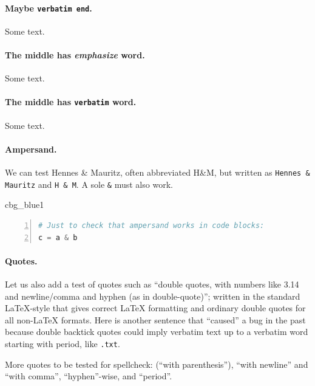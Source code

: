 \n\documentclass[%
oneside,                 %
final,                   %
10pt]{article}
\newenvironment{_cod_tight}[1]{
   \def\FrameCommand{\colorbox{#1}}
   \FrameRule0.6pt\MakeFramed {\FrameRestore}\vskip3mm}
   {\vskip0mm\endMakeFramed}
\newenvironment{cod}[1]{
\bgroup\rmfamily
\fboxsep=0mm\relax
\begin{_cod_tight}{#1}
\list{}{\parsep=-2mm\parskip=0mm\topsep=0pt\leftmargin=2mm
\rightmargin=2\leftmargin\leftmargin=4pt\relax}
\item\relax}
{\endlist\end{_cod_tight}\egroup}
\theoremstyle{definition}
\begin{document}
\begin{enumerate}
\paragraph{Maybe \texttt{verbatim end}.}
Some text.

\paragraph{The middle has \emph{emphasize} word.}
Some text.

\paragraph{The middle has \texttt{verbatim} word.}
Some text.

\paragraph{Ampersand.}
We can test Hennes {\&} Mauritz, often abbreviated H{\&}M, but written
as \Verb!Hennes & Mauritz! and \Verb!H & M!.
A sole \Verb!&! must also work.




\begin{cod}{cbg_blue1}\begin{lstlisting}[language=Python,style=myspeciallststyle,numbers=left,numberstyle=\tiny,stepnumber=3,numbersep=15pt,xleftmargin=1mm]
# Just to check that ampersand works in code blocks:
c = a & b

\end{lstlisting}\end{cod}
\noindent


\paragraph{Quotes.}
Let us also add a test of quotes such as ``double quotes, with numbers
like 3.14 and newline/comma and hyphen (as in double-quote)''; written
in the standard LaTeX-style that gives correct {\LaTeX} formatting and
ordinary double quotes for all non-LaTeX formats.  Here is another
sentence that ``caused'' a bug in the past because double backtick
quotes could imply verbatim text up to a verbatim word starting with
period, like \texttt{.txt}.

More quotes to be tested for spellcheck:
(``with parenthesis''), ``with newline''
and ``with comma'', ``hyphen''-wise, and ``period''.


\end{enumerate}
\end{document}
